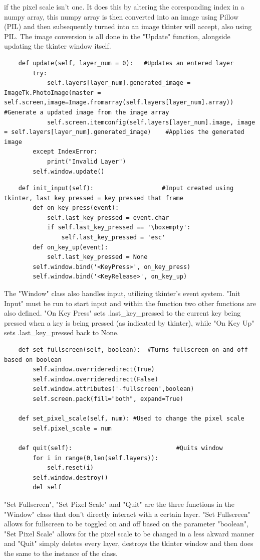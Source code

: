 if the pixel scale isn't one. It does this by altering the coresponding index in a numpy array, this numpy array is then converted into an
image using Pillow (PIL) and then subsequently turned into an image tkinter will accept, also using PIL. The image conversion is all done
in the "Update" function, alongside updating the tkinter window itself.
\begin{lstlisting}
    def update(self, layer_num = 0):   #Updates an entered layer
        try:
            self.layers[layer_num].generated_image = ImageTk.PhotoImage(master = self.screen,image=Image.fromarray(self.layers[layer_num].array)) #Generate a updated image from the image array
            self.screen.itemconfig(self.layers[layer_num].image, image = self.layers[layer_num].generated_image)    #Applies the generated image
        except IndexError:
            print("Invalid Layer")
        self.window.update()
\end{lstlisting}
\begin{lstlisting}
    def init_input(self):                   #Input created using tkinter, last key pressed = key pressed that frame
        def on_key_press(event):
            self.last_key_pressed = event.char
            if self.last_key_pressed == '\boxempty':
                self.last_key_pressed = 'esc'
        def on_key_up(event):
            self.last_key_pressed = None
        self.window.bind('<KeyPress>', on_key_press)
        self.window.bind('<KeyRelease>', on_key_up)
\end{lstlisting}
The "Window" class also handles input, utilizing tkinter's event system. "Init Input" must be run to start input and within the function two other
functions are also defined. "On Key Press" sets .last\_key\_pressed to the current key being pressed when a key is being pressed (as indicated by tkinter), while
"On Key Up" sets .last\_key\_pressed back to \textcolor{amber}{None}. 
\begin{lstlisting}
    def set_fullscreen(self, boolean):  #Turns fullscreen on and off based on boolean
        self.window.overrideredirect(True)
        self.window.overrideredirect(False)
        self.window.attributes('-fullscreen',boolean)
        self.screen.pack(fill="both", expand=True)

    def set_pixel_scale(self, num): #Used to change the pixel scale
        self.pixel_scale = num

    def quit(self):                             #Quits window
        for i in range(0,len(self.layers)):
            self.reset(i)
        self.window.destroy()
        del self
\end{lstlisting}
"Set Fullscreen", "Set Pixel Scale" and "Quit" are the three functions in the "Window" class that don't directly interact with a certain layer. "Set Fullscreen" allows for fullscreen
to be toggled on and off based on the parameter "boolean", "Set Pixel Scale" allows for the pixel scale to be changed in a less akward manner and "Quit" simply deletes every layer,
destroys the tkinter window and then does the same to the instance of the class.

